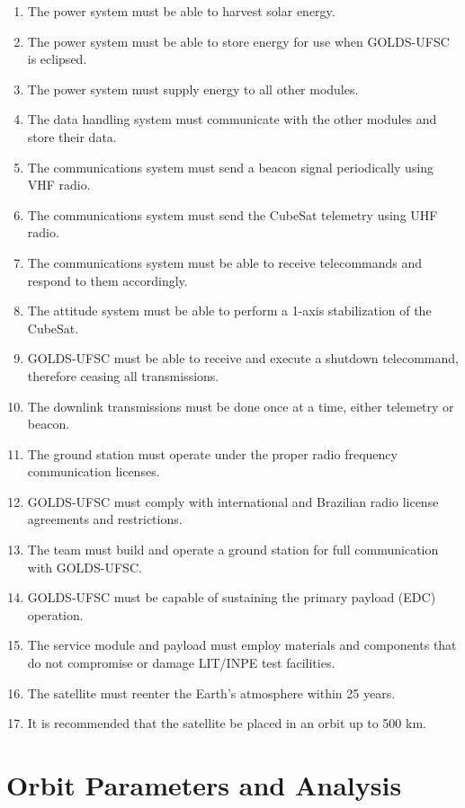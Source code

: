 \begin{enumerate}
    \item The power system must be able to harvest solar energy.
    \item The power system must be able to store energy for use when GOLDS-UFSC is eclipsed.
    \item The power system must supply energy to all other modules.
    \item The data handling system must communicate with the other modules and store their data.
    \item The communications system must send a beacon signal periodically using VHF radio.
    \item The communications system must send the CubeSat telemetry using UHF radio.
    \item The communications system must be able to receive telecommands and respond to them accordingly.
    \item The attitude system must be able to perform a 1-axis stabilization of the CubeSat.
    \item GOLDS-UFSC must be able to receive and execute a shutdown telecommand, therefore ceasing all transmissions.
    \item The downlink transmissions must be done once at a time, either telemetry or beacon.
    \item The ground station must operate under the proper radio frequency communication licenses.
    \item GOLDS-UFSC must comply with international and Brazilian radio license agreements and restrictions.
    \item The team must build and operate a ground station for full communication with GOLDS-UFSC.
    \item GOLDS-UFSC must be capable of sustaining the primary payload (EDC) operation.
    \item The service module and payload must employ materials and components that do not compromise or damage LIT/INPE test facilities.
    \item The satellite must reenter the Earth's atmosphere within 25 years.
    \item It is recommended that the satellite be placed in an orbit up to 500 km.
\end{enumerate}


\section{Orbit Parameters and Analysis}

